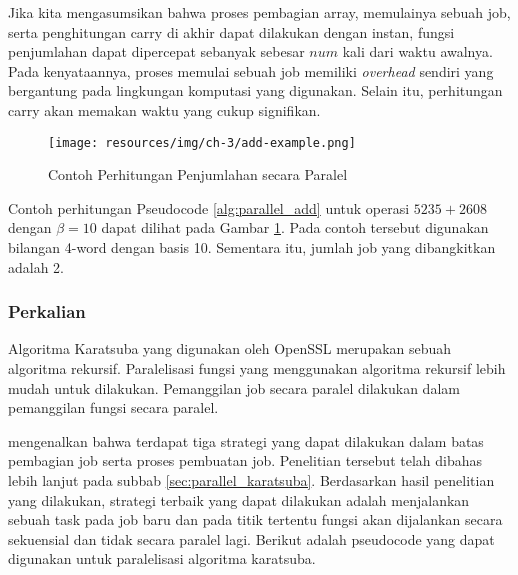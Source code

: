       Jika kita mengasumsikan bahwa proses pembagian array, memulainya sebuah job, serta penghitungan carry di akhir dapat dilakukan dengan instan, fungsi penjumlahan dapat dipercepat sebanyak sebesar $num$ kali dari waktu awalnya. Pada kenyataannya, proses memulai sebuah job memiliki \textit{overhead} sendiri yang bergantung pada lingkungan komputasi yang digunakan. Selain itu, perhitungan carry akan memakan waktu yang cukup signifikan.

      \begin{figure}
          \centering
          \texttt{[image: resources/img/ch-3/add-example.png]}
          \caption{Contoh Perhitungan Penjumlahan secara Paralel}
          \label{fig:add_par_example}
      \end{figure}

      Contoh perhitungan Pseudocode \ref{alg:parallel_add} untuk operasi $5235 + 2608$ dengan $\beta = 10$ dapat dilihat pada Gambar \ref{fig:add_par_example}. Pada contoh tersebut digunakan bilangan 4-word dengan basis 10. Sementara itu, jumlah job yang dibangkitkan adalah 2.


    \subsubsection{Perkalian} \label{sec:mul_parallel}

      Algoritma Karatsuba yang digunakan oleh OpenSSL merupakan sebuah algoritma rekursif. Paralelisasi fungsi yang menggunakan algoritma rekursif lebih mudah untuk dilakukan. Pemanggilan job secara paralel dilakukan dalam pemanggilan fungsi secara paralel.

      \citet{parallel_karatsuba_analysis} mengenalkan bahwa terdapat tiga strategi yang dapat dilakukan dalam batas pembagian job serta proses pembuatan job. Penelitian tersebut telah dibahas lebih lanjut  pada subbab \ref{sec:parallel_karatsuba}. Berdasarkan hasil penelitian yang dilakukan, strategi terbaik yang dapat dilakukan adalah menjalankan sebuah task pada job baru dan pada titik tertentu fungsi akan dijalankan secara sekuensial dan tidak secara paralel lagi. Berikut adalah pseudocode yang dapat digunakan untuk paralelisasi algoritma karatsuba.

